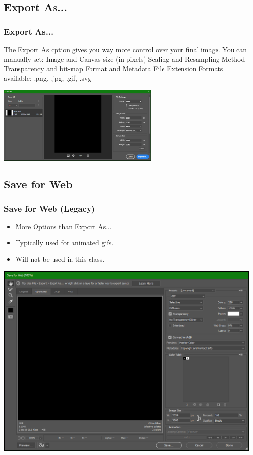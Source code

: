 \documentclass{beamer}
\begin{document}
\subsection{Export As...}
\begin{frame}
	\frametitle{Export As...}
	\begin{outline}
		\1 The Export As option gives you way more control over your final image.
		\1 You can manually set:
		\2 Image and Canvas size (in pixels)
		\2 Scaling and Resampling Method
		\2 Transparency and bit-map
		\2 Format and Metadata
		\1 File Extension Formats available:
		\2 .png, .jpg, .gif, .svg
	\end{outline}
	\begin{center}
		\includegraphics[width = 0.6\textwidth]{images/export as.png}
	\end{center}
\end{frame}

\subsection{Save for Web}
\begin{frame}
	\frametitle{Save for Web (Legacy)}	
		\begin{itemize}
			\item More Options than Export As...
			\item Typically used for animated gifs.
			\item Will not be used in this class.
		\end{itemize}
	\begin{center}
		\includegraphics[width=.7\textwidth]{images/save for web.png}
		\end{center}
\end{frame}
\end{document}
